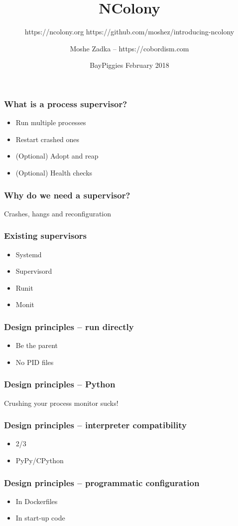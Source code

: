 \documentclass{beamer}
\title{NColony}
\subtitle{https://ncolony.org https://github.com/moshez/introducing-ncolony}
\author{Moshe Zadka -- https://cobordism.com}
\date{BayPiggies February 2018}
\begin{document}
 
\frame{\titlepage}

\begin{frame}
\frametitle{What is a process supervisor?}
\begin{itemize}
\item Run multiple processes \pause
\item Restart crashed ones \pause
\item (Optional) Adopt and reap \pause
\item (Optional) Health checks
\end{itemize}
\end{frame}

\begin{frame}
\frametitle{Why do we need a supervisor?}
Crashes, hangs and reconfiguration
\end{frame}

\begin{frame}
\frametitle{Existing supervisors}
\begin{itemize}
\item Systemd
\item Supervisord
\item Runit
\item Monit
\end{itemize}
\end{frame}


\begin{frame}
\frametitle{Design principles -- run directly}
\begin{itemize}
\item Be the parent \pause
\item No PID files
\end{itemize}
\end{frame}

\begin{frame}
\frametitle{Design principles -- Python}
Crushing your process monitor sucks!
\end{frame}

\begin{frame}
\frametitle{Design principles -- interpreter compatibility}
\begin{itemize}
\item 2/3
\item PyPy/CPython
\end{itemize}
\end{frame}

\begin{frame}
\frametitle{Design principles -- programmatic configuration}
\begin{itemize}
\item In Dockerfiles
\item In start-up code
\end{itemize}
\end{frame}
\end{document}
